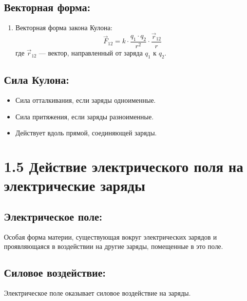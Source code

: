 \documentclass[a4paper,12pt]{article}
\begin{document}
\vspace{-9pt}
\subsection*{Векторная форма:}
\vspace{-3pt}
\begin{enumerate}[itemsep=0pt, topsep=0pt, parsep=3pt]
  \item Векторная форма закона Кулона:
  \vspace{-0.05em}
  $$ \vec{F}_{12} = k \cdot \frac{q_1 \cdot q_2}{r^2} \cdot \frac{\vec{r}_{12}}{r} $$
  где $\vec{r}_{12}$ — вектор, направленный от заряда $q_1$ к $q_2$.
\end{enumerate}

\vspace{-9pt}
\subsection*{Сила Кулона:}
\vspace{-3pt}
\begin{itemize}
  \item Сила отталкивания, если заряды одноименные.
  \item Сила притяжения, если заряды разноименные.
  \item Действует вдоль прямой, соединяющей заряды.
\end{itemize}

\newpage

\section*{1.5 Действие электрического поля на электрические заряды}

\vspace{-9pt}
\subsection*{Электрическое поле:}
\vspace{-3pt}
Особая форма материи, существующая вокруг электрических зарядов и проявляющаяся в воздействии на другие заряды, помещенные в это поле.

\vspace{-9pt}
\subsection*{Силовое воздействие:}
\vspace{-3pt}
Электрическое поле оказывает силовое воздействие на заряды.
\end{document}
